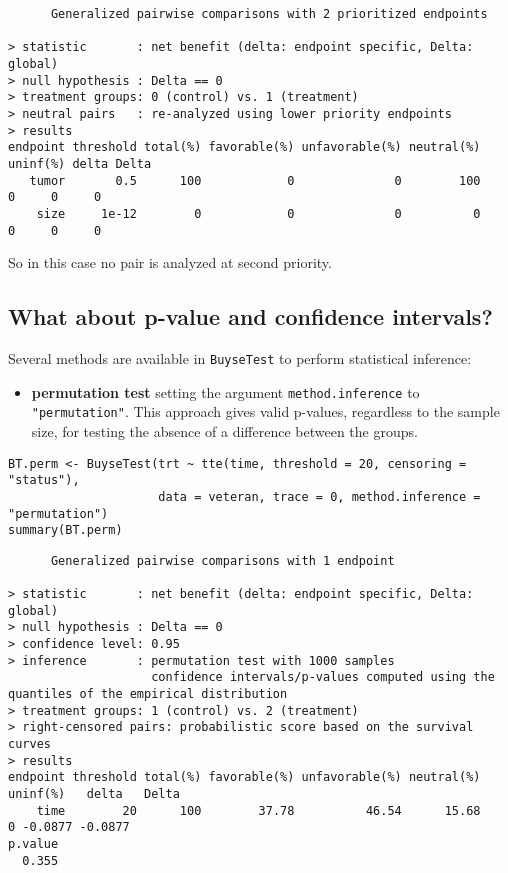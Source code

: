 \documentclass[12pt]{article}
\begin{document}
\begin{verbatim}
      Generalized pairwise comparisons with 2 prioritized endpoints

> statistic       : net benefit (delta: endpoint specific, Delta: global) 
> null hypothesis : Delta == 0 
> treatment groups: 0 (control) vs. 1 (treatment) 
> neutral pairs   : re-analyzed using lower priority endpoints
> results
endpoint threshold total(%) favorable(%) unfavorable(%) neutral(%) uninf(%) delta Delta
   tumor       0.5      100            0              0        100        0     0     0
    size     1e-12        0            0              0          0        0     0     0
\end{verbatim}

So in this case no pair is analyzed at second priority.

\clearpage

\subsection{What about p-value and confidence intervals?}
\label{sec:org259179f}

Several methods are available in \texttt{BuyseTest} to perform statistical inference:
\begin{itemize}
\item \textbf{permutation test} setting the argument \texttt{method.inference} to
\texttt{"permutation"}. This approach gives valid p-values, regardless to
the sample size, for testing the absence of a difference between the
groups.
\end{itemize}
\lstset{language=r,label= ,caption= ,captionpos=b,numbers=none}
\begin{lstlisting}
BT.perm <- BuyseTest(trt ~ tte(time, threshold = 20, censoring = "status"),
					 data = veteran, trace = 0, method.inference = "permutation") 
summary(BT.perm)
\end{lstlisting}

\begin{verbatim}
      Generalized pairwise comparisons with 1 endpoint

> statistic       : net benefit (delta: endpoint specific, Delta: global) 
> null hypothesis : Delta == 0 
> confidence level: 0.95 
> inference       : permutation test with 1000 samples 
                    confidence intervals/p-values computed using the quantiles of the empirical distribution 
> treatment groups: 1 (control) vs. 2 (treatment) 
> right-censored pairs: probabilistic score based on the survival curves
> results
endpoint threshold total(%) favorable(%) unfavorable(%) neutral(%) uninf(%)   delta   Delta
    time        20      100        37.78          46.54      15.68        0 -0.0877 -0.0877
p.value 
  0.355
\end{verbatim}
\end{document}
